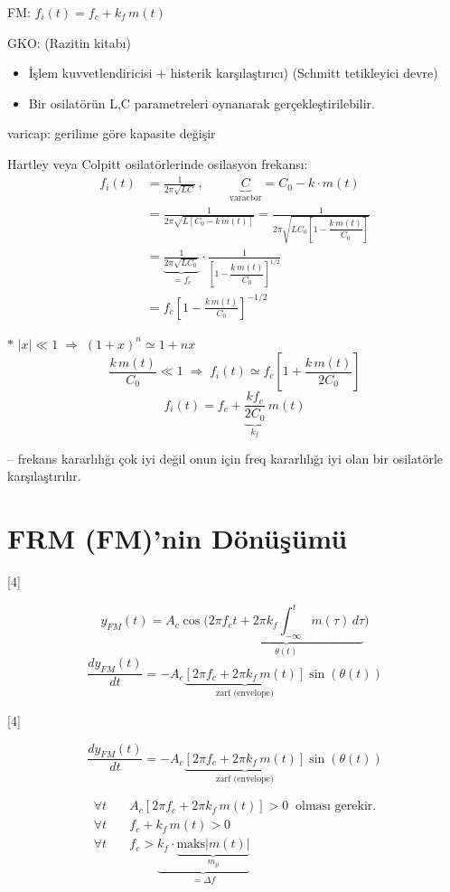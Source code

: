 \documentclass[11pt,a4paper]{article}
\begin{document}
FM: $f_i(t)=f_c+k_f\,m(t)$

GKO: (Razitin kitabı)
\begin{itemize}
\item İşlem kuvvetlendiricisi $+$ histerik karşılaştırıcı) (Schmitt tetikleyici devre)
\item Bir osilatörün L,C parametreleri oynanarak gerçekleştirilebilir.
\end{itemize}
varicap: gerilime göre kapasite değişir

Hartley veya Colpitt osilatörlerinde osilasyon frekansı:
\begin{align*}
f_i(t) &= \frac{1}{2\pi\sqrt{LC}}\,, \qquad \underbrace{C}_{\text{varactor}} = C_0 - k\cdot m(t) \\
&= \frac{1}{2\pi\sqrt{L\left[C_0-k\,m(t)\right]}} = \frac{1}{2\pi\sqrt{LC_0\left[1-\dfrac{k\,m(t)}{C_0}\right]}} \\
&= \underbrace{\frac{1}{2\pi\sqrt{LC_0}}}_{=f_c}\cdot\frac{1}{\left[1-\dfrac{k\,m(t)}{C_0}\right]^{1/2}} \\
&= f_c\left[1-\frac{k\,m(t)}{C_0}\right]^{-1/2}
\end{align*}

$\ast$ $|x|\ll 1 \;\Rightarrow\; (1+x)^n \simeq 1+nx$
\[ \frac{k\,m(t)}{C_0}\ll 1 \;\Rightarrow\; f_i(t)\simeq f_c\left[1+\frac{k\,m(t)}{2C_0}\right] \]
\[ f_i(t)=f_c+\underbrace{\frac{k f_c}{2C_0}}_{k_f}\,m(t) \]

-- frekans kararlılığı çok iyi değil onun için freq kararlılığı iyi olan bir osilatörle karşılaştırılır.

\section{FRM (FM)'nin Dönüşümü}

[4]

\[ y_{FM}(t) = A_c\cos\Big(\underbrace{2\pi f_c t + 2\pi k_f\int_{-\infty}^{t} m(\tau)\,d\tau}_{\theta(t)}\Big) \]
\[ \frac{dy_{FM}(t)}{dt} = -A_c\underbrace{\left[2\pi f_c + 2\pi k_f\,m(t)\right]}_{\text{zarf (envelope)}}\sin(\theta(t)) \]

[4]

\[ \frac{dy_{FM}(t)}{dt} = -A_c\underbrace{\left[2\pi f_c + 2\pi k_f\,m(t)\right]}_{\text{zarf (envelope)}}\sin(\theta(t)) \]

\begin{align*}
\forall t\quad & A_c\left[2\pi f_c+2\pi k_f\,m(t)\right]>0 \ \text{ olması gerekir.} \\
\forall t\quad & f_c+k_f\,m(t)>0 \\
\forall t\quad & f_c>\underbrace{k_f\cdot\underbrace{\mathrm{maks}|m(t)|}_{m_p}}_{=\Delta f}
\end{align*}
\end{document}
